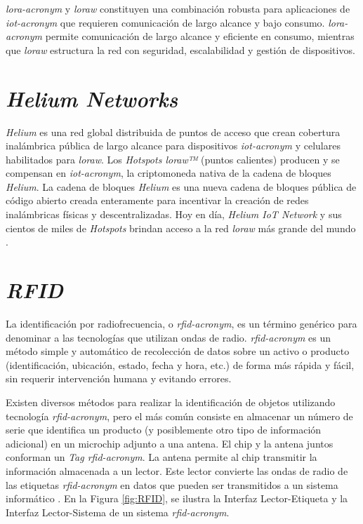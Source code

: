 \textit{\acrshort{lora-acronym}} y \textit{\acrshort{loraw}} constituyen una combinación robusta para aplicaciones de \textit{\acrshort{iot-acronym}} que requieren comunicación de largo alcance y bajo consumo. \textit{\acrshort{lora-acronym}} permite comunicación de largo alcance y eficiente en consumo, mientras que \textit{\acrshort{loraw}} estructura la red con seguridad, escalabilidad y gestión de dispositivos.


\section{\textit{Helium Networks}}

\textit{Helium} es una red global distribuida de puntos de acceso que crean cobertura inalámbrica pública de largo alcance para dispositivos \textit{\acrshort{iot-acronym}} y celulares habilitados para \textit{\acrshort{loraw}}. Los \textit{Hotspots \acrshort{loraw}™} (puntos calientes) producen y se compensan en \textit{\acrshort{iot-acronym}}, la criptomoneda nativa de la cadena de bloques \textit{Helium}. La cadena de bloques \textit{Helium} es una nueva cadena de bloques pública de código abierto creada enteramente para incentivar la creación de redes inalámbricas físicas y descentralizadas. Hoy en día, \textit{Helium IoT Network} y sus cientos de miles de \textit{Hotspots} brindan acceso a la red \textit{\acrshort{loraw}} más grande del mundo \cite{heliumDocs}.

\section{\textit{RFID}}

La identificación por radiofrecuencia, o \textit{\acrshort{rfid-acronym}}, es un término genérico para denominar a las tecnologías que utilizan ondas de radio. \textit{\acrshort{rfid-acronym}} es un método simple y automático de recolección de datos sobre un activo o producto (identificación, ubicación, estado, fecha y hora, etc.) de forma más rápida y fácil, sin requerir intervención humana y evitando errores.

Existen diversos métodos para realizar la identificación de objetos utilizando tecnología \textit{\acrshort{rfid-acronym}}, pero el más común consiste en almacenar un número de serie que identifica un producto (y posiblemente otro tipo de información adicional) en un microchip adjunto a una antena. El chip y la antena juntos conforman un \textit{Tag \acrshort{rfid-acronym}}. La antena permite al chip transmitir la información almacenada a un lector. Este lector convierte las ondas de radio de las etiquetas \textit{\acrshort{rfid-acronym}} en datos que pueden ser transmitidos a un sistema informático \cite{rfid}. En la Figura \ref{fig:RFID}, se ilustra la Interfaz Lector-Etiqueta y la Interfaz Lector-Sistema de un sistema \textit{\acrshort{rfid-acronym}}.

